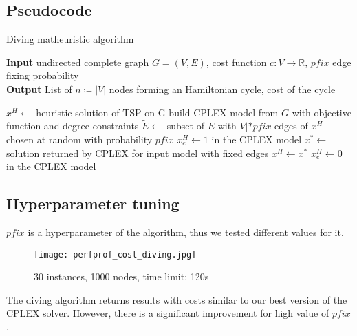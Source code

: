 \subsection{Pseudocode}
\begin{algorithm}[h]
    \caption{Diving matheuristic algorithm}
    \hspace*{\algorithmicindent} \textbf{Input} undirected complete graph $G=(V,E)$, cost function $c:V\rightarrow\mathbb{R}$, $pfix$ edge fixing probability\\
    \hspace*{\algorithmicindent} \textbf{Output} List of $n\coloneq|V|$ nodes forming an Hamiltonian cycle, cost of the cycle
    \begin{algorithmic}

        \State $x^H \leftarrow$ heuristic solution of TSP on G
        \State build CPLEX model from $G$ with objective function and degree constraints
        \State $\tilde{E} \leftarrow$ subset of $E$ with $V|*pfix$ edges of $x^H$ chosen at random with probability $pfix$
        \State $x_e^H\leftarrow1$ in the CPLEX model
        \EndFor
        \State $x^*\leftarrow$ solution returned by CPLEX for input model with fixed edges
        \State $x^H\leftarrow x^*$
        \EndIf
        \State $x_e^H\leftarrow0$ in the CPLEX model
        \EndFor
        \EndWhile

    \end{algorithmic}
\end{algorithm}
\FloatBarrier

\subsection{Hyperparameter tuning}

$pfix$ is a hyperparameter of the algorithm, thus we tested different values for it.

\begin{figure}[h]
    \centering
    \texttt{[image: perfprof\_cost\_diving.jpg]}
    \caption*{30 instances, 1000 nodes, time limit: 120s}
\end{figure}

The diving algorithm returns results with costs similar to our best version of the CPLEX solver. However, there is a significant improvement for high value of $pfix$.

